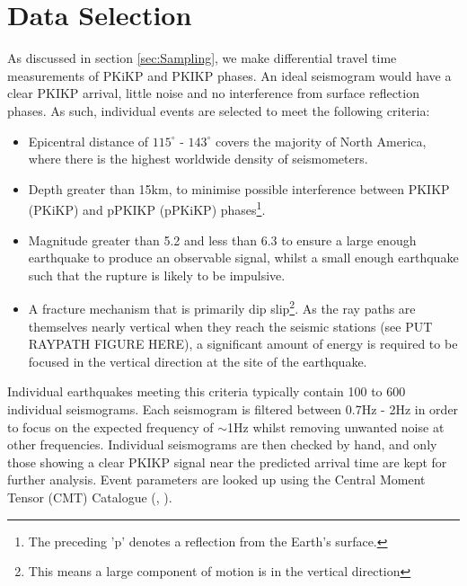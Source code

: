 \documentclass[11pt,a4paper]{article}
\begin{document}
\section{Data Selection}
\label{sec:Data}
As discussed in section \ref{sec:Sampling}, we make differential travel time measurements of PKiKP and PKIKP phases. An ideal seismogram would have a clear PKIKP arrival, little noise and no interference from surface reflection phases. As such, individual events are selected to meet the following criteria:

\begin{itemize}
	\item Epicentral distance of $115^{\circ}$ - $143^{\circ}$ covers the majority of North America, where there is the highest worldwide density of seismometers.
	\item  Depth greater than 15km, to minimise possible interference between PKIKP (PKiKP) and pPKIKP (pPKiKP) phases\footnote{The preceding 'p' denotes a reflection from the Earth's surface.}.
	\item Magnitude greater than 5.2 and less than 6.3 to ensure a large enough earthquake to produce an observable signal, whilst a small enough earthquake such that the rupture is likely to be impulsive.
	\item A fracture mechanism that is primarily dip slip\footnote{This means a large component of motion is in the vertical direction}. As the ray paths are themselves nearly vertical when they reach the seismic stations (see PUT RAYPATH FIGURE HERE), a significant amount of energy is required to be focused in the vertical direction at the site of the earthquake.
\end{itemize}

Individual earthquakes meeting this criteria typically contain 100 to 600 individual seismograms. Each seismogram is filtered between 0.7Hz - 2Hz in order to focus on the expected frequency of $\sim$1Hz whilst removing unwanted noise at other frequencies. Individual seismograms are then checked by hand, and only those showing a clear PKIKP signal near the predicted arrival time are kept for further analysis. Event parameters are looked up using the Central Moment Tensor (CMT) Catalogue (\cite{Dziewonski1981}, \cite{Ekstrom2012}).

\end{document}
